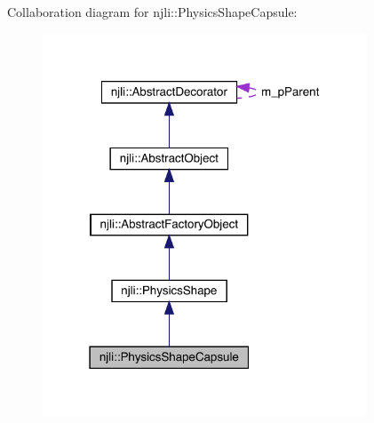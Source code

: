 Collaboration diagram for njli\+:\+:Physics\+Shape\+Capsule\+:\nopagebreak
\begin{figure}[H]
\begin{center}
\leavevmode
\includegraphics[width=274pt]{classnjli_1_1_physics_shape_capsule__coll__graph}
\end{center}
\end{figure}

